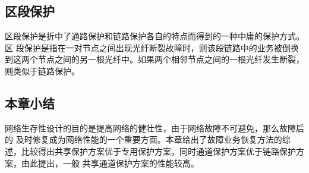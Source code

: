 \subsection{区段保护}
区段保护是折中了通路保护和链路保护各自的特点而得到的一种中庸的保护方式。区 段保护是指在一对节点之间出现光纤断裂故障时，则该段链路中的业务被倒换到这两个节点之间的另一根光纤中。如果两个相邻节点之间的一根光纤发生断裂，则类似于链路保护。
\subsection{本章小结}
网络生存性设计的目的是提高网络的健壮性，由于网络故障不可避免，那么故障后的 及时修复成为网络性能的一个重要方面。本章给出了故障业务恢复方法的综述，比较得出共享保护方案优于专用保护方案，同时通道保护方案优于链路保护方案，由此提出，一般 共享通道保护方案的性能较高。



